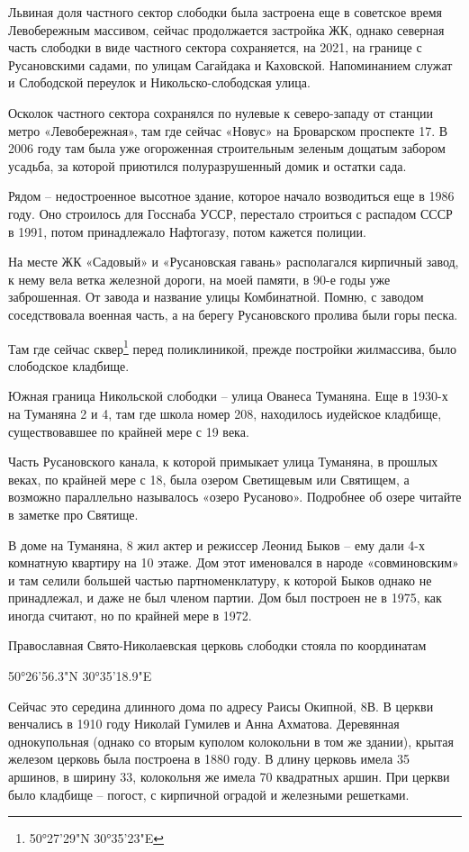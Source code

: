 Львиная доля частного сектор слободки была застроена еще в советское время Левобережным массивом, сейчас продолжается застройка ЖК, однако северная часть слободки в виде частного сектора сохраняется, на 2021, на границе с Русановскими садами, по улицам Сагайдака и Каховской. Напоминанием служат и Слободской переулок и Никольско-слободская улица.

Осколок частного сектора сохранялся по нулевые к северо-западу от станции метро «Левобережная», там где сейчас «Новус» на Броварском проспекте 17. В 2006 году там была уже огороженная строительным зеленым дощатым забором усадьба, за которой приютился полуразрушенный домик и остатки сада.

Рядом – недостроенное высотное здание, которое начало возводиться еще в 1986 году. Оно строилось для Госснаба УССР, перестало строиться с распадом СССР в 1991, потом принадлежало Нафтогазу, потом кажется полиции.

На месте ЖК «Садовый» и «Русановская гавань» располагался кирпичный завод, к нему вела ветка железной дороги, на моей памяти, в 90-е годы уже заброшенная. От завода и название улицы Комбинатной. Помню, с заводом соседствовала военная часть, а на берегу Русановского пролива были горы песка.

Там где сейчас сквер\footnote{50°27'29"N 30°35'23"E} перед поликлиникой, прежде постройки жилмассива, было слободское кладбище.

Южная граница Никольской слободки – улица Ованеса Туманяна. Еще в 1930-х на Туманяна 2 и 4, там где школа номер 208, находилось иудейское кладбище, существовавшее по крайней мере с 19 века.

Часть Русановского канала, к которой примыкает улица Туманяна, в прошлых веках, по крайней мере с 18, была озером Светищевым или Святищем, а возможно параллельно называлось «озеро Русаново». Подробнее об озере читайте в заметке про Святище.

В доме на Туманяна, 8 жил актер и режиссер Леонид Быков – ему дали 4-х комнатную квартиру на 10 этаже. Дом этот именовался в народе «совминовским» и там селили большей частью партноменклатуру, к которой Быков однако не принадлежал, и даже не был членом партии. Дом был построен не в 1975, как иногда считают, но по крайней мере в 1972.

Православная Свято-Николаевская церковь слободки стояла по координатам

50°26'56.3"N 30°35'18.9"E

Сейчас это середина длинного дома по адресу Раисы Окипной, 8В. В церкви венчались в 1910 году Николай Гумилев и Анна Ахматова. Деревянная однокупольная (однако со вторым куполом колокольни в том же здании), крытая железом церковь была построена в 1880 году. В длину церковь имела 35 аршинов, в ширину 33, колокольня же имела 70 квадратных аршин. При церкви было кладбище – погост, с кирпичной оградой и железными решетками. 

